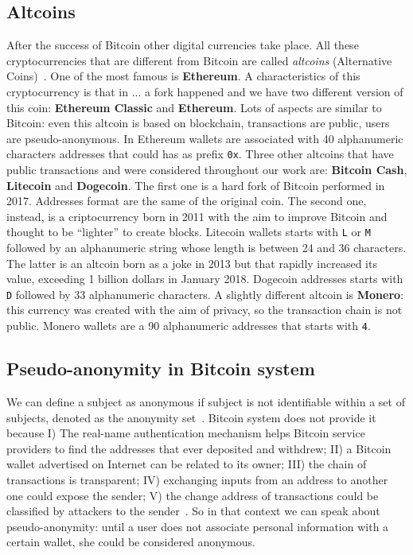 \subsection{Altcoins}
After the success of Bitcoin other digital currencies take place. All these
cryptocurrencies that are different from Bitcoin are called \textit{altcoins}
(Alternative Coins)~\cite{bitcoinbeyond}. One of the most famous is 
\textbf{Ethereum}. A characteristics of this cryptocurrency is that in ... a
fork happened and we have two different version of this coin: \textbf{Ethereum
Classic} and \textbf{Ethereum}. Lots of aspects are similar to Bitcoin: even
this altcoin is based on blockchain, transactions are public, users are
pseudo-anonymous. In Ethereum wallets are associated with 40 alphanumeric
characters addresses that could has as prefix \texttt{0x}. Three other altcoins
that have public transactions and were considered throughout our work are: 
\textbf{Bitcoin Cash}, \textbf{Litecoin} and \textbf{Dogecoin}. The first one
is a hard fork of Bitcoin performed in 2017. Addresses format are the same of
the original coin. The second one, instead, is a criptocurrency born in 2011
with the aim to improve Bitcoin and thought to be ``lighter'' to create blocks.
Litecoin wallets starts with \texttt{L} or \texttt{M} followed by an
alphanumeric string whose length is between 24 and 36 characters. The latter
is an altcoin born as a joke in 2013 but that rapidly increased its value,
exceeding 1 billion dollars in January 2018. Dogecoin addresses starts with
\texttt{D} followed by 33 alphanumeric characters. A slightly different altcoin
is \textbf{Monero}: this currency was created with the aim of privacy, so the
transaction chain is not public. Monero wallets are a 90 alphanumeric addresses
that starts with \texttt{4}.


\subsection{Pseudo-anonymity in Bitcoin system}
We can define a subject as anonymous if subject is not identifiable within a
set of subjects, denoted as the anonymity set~\cite{terminology}. Bitcoin system
does not provide it because I) The real-name authentication mechanism
helps Bitcoin service providers to find the addresses that ever deposited and
withdrew; II) a Bitcoin wallet advertised on Internet can be related to its
owner; III) the chain of transactions is transparent; IV) exchanging inputs
from an address to another one could expose the sender; V) the change address
of transactions could be classified by attackers to the sender~\cite{deanon}.
So in that context we can speak about pseudo-anonymity: until a user does not
associate personal information with a certain wallet, she could be considered
anonymous.